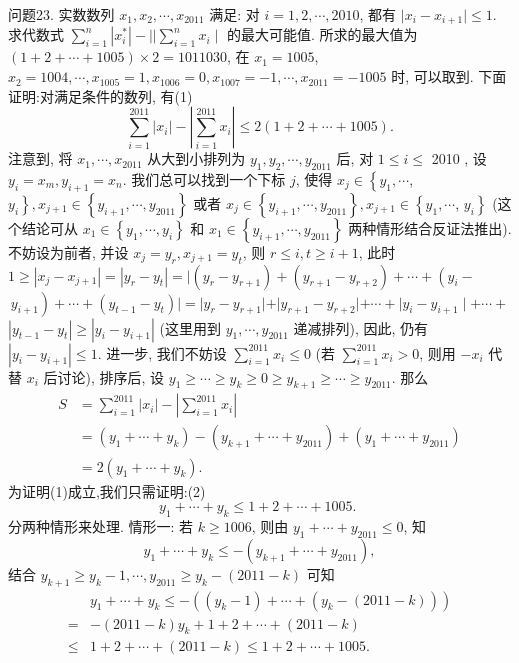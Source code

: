 问题23. 实数数列 $x_1, x_2, \cdots, x_{2011}$ 满足: 对 $i=1,2, \cdots, 2010$, 都有 $\mid x_i-x_{i+1} \mid \leqslant 1$. 求代数式 $\sum_{i=1}^n\left|x_i^*\right|-|| \sum_{i=1}^n x_i \mid$ 的最大可能值.
所求的最大值为 $(1+2+\cdots+1005) \times 2=1011030$, 在 $x_1=1005$, $x_2=1004, \cdots, x_{1005}=1, x_{1006}=0, x_{1007}=-1, \cdots, x_{2011}=-1005$ 时, 可以取到.
下面证明:对满足条件的数列, 有(1)
$$
\sum_{i=1}^{2011}\left|x_i\right|-\left|\sum_{i=1}^{2011} x_i\right| \leqslant 2(1+2+\cdots+1005) .
$$
注意到, 将 $x_1, \cdots, x_{2011}$ 从大到小排列为 $y_1, y_2, \cdots, y_{2011}$ 后, 对 $1 \leqslant i \leqslant$ 2010 , 设 $y_i=x_m, y_{i+1}=x_n$. 我们总可以找到一个下标 $j$, 使得 $x_j \in\left\{y_1, \cdots\right.$, $\left.y_i\right\}, x_{j+1} \in\left\{y_{i+1}, \cdots, y_{2011}\right\}$ 或者 $x_j \in\left\{y_{i+1}, \cdots, y_{2011}\right\}, x_{j+1} \in\left\{y_1, \cdots\right.$, $\left.y_i\right\}$ (这个结论可从 $x_1 \in\left\{y_1, \cdots, y_i\right\}$ 和 $x_1 \in\left\{y_{i+1}, \cdots, y_{2011}\right\}$ 两种情形结合反证法推出). 不妨设为前者, 并设 $x_j=y_r, x_{j+1}=y_t$, 则 $r \leqslant i, t \geqslant i+1$, 此时 $1 \geqslant\left|x_j-x_{j+1}\right|=\left|y_r-y_t\right|=\mid\left(y_r-y_{r+1}\right)+\left(y_{r+1}-y_{r+2}\right)+\cdots+\left(y_i-\right.$
$$
\left.y_{i+1}\right)+\cdots+\left(y_{t-1}-y_t\right)|=| y_r-y_{r+1}|+| y_{r+1}-y_{r+2}|+\cdots+| y_i-y_{i+1} \mid+\cdots+
$$
$\left|y_{t-1}-y_t\right| \geqslant\left|y_i-y_{i+1}\right|$ (这里用到 $y_1, \cdots, y_{2011}$ 递减排列), 因此, 仍有 $\left|y_i-y_{i+1}\right| \leqslant 1$.
进一步, 我们不妨设 $\sum_{i=1}^{2011} x_i \leqslant 0$ (若 $\sum_{i=1}^{2011} x_i>0$, 则用 $-x_i$ 代替 $x_i$ 后讨论), 排序后, 设 $y_1 \geqslant \cdots \geqslant y_k \geqslant 0 \geqslant y_{k+1} \geqslant \cdots \geqslant y_{2011}$. 那么
$$
\begin{aligned}
S & =\sum_{i=1}^{2011}\left|x_i\right|-\left|\sum_{i=1}^{2011} x_i\right| \\
& =\left(y_1+\cdots+y_k\right)-\left(y_{k+1}+\cdots+y_{2011}\right)+\left(y_1+\cdots+y_{2011}\right) \\
& =2\left(y_1+\cdots+y_k\right) .
\end{aligned}
$$
为证明(1)成立,我们只需证明:(2)
$$
y_1+\cdots+y_k \leqslant 1+2+\cdots+1005 \text {. }
$$
分两种情形来处理.
情形一: 若 $k \geqslant 1006$, 则由 $y_1+\cdots+y_{2011} \leqslant 0$, 知
$$
y_1+\cdots+y_k \leqslant-\left(y_{k+1}+\cdots+y_{2011}\right),
$$
结合 $y_{k+1} \geqslant y_k-1, \cdots, y_{2011} \geqslant y_k-(2011-k)$ 可知
$$
\begin{aligned}
& y_1+\cdots+y_k \leqslant-\left(\left(y_k-1\right)+\cdots+\left(y_k-(2011-k)\right)\right) \\
= & -(2011-k) y_k+1+2+\cdots+(2011-k) \\
\leqslant & 1+2+\cdots+(2011-k) \leqslant 1+2+\cdots+1005 .
\end{aligned}
$$
